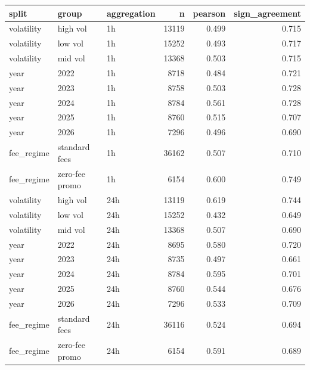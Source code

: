 \begin{tabular}{lllrrr}
\toprule
split & group & aggregation & n & pearson & sign_agreement \\
\midrule
volatility & high vol & 1h & 13119 & 0.499 & 0.715 \\
volatility & low vol & 1h & 15252 & 0.493 & 0.717 \\
volatility & mid vol & 1h & 13368 & 0.503 & 0.715 \\
year & 2022 & 1h & 8718 & 0.484 & 0.721 \\
year & 2023 & 1h & 8758 & 0.503 & 0.728 \\
year & 2024 & 1h & 8784 & 0.561 & 0.728 \\
year & 2025 & 1h & 8760 & 0.515 & 0.707 \\
year & 2026 & 1h & 7296 & 0.496 & 0.690 \\
fee_regime & standard fees & 1h & 36162 & 0.507 & 0.710 \\
fee_regime & zero-fee promo & 1h & 6154 & 0.600 & 0.749 \\
volatility & high vol & 24h & 13119 & 0.619 & 0.744 \\
volatility & low vol & 24h & 15252 & 0.432 & 0.649 \\
volatility & mid vol & 24h & 13368 & 0.507 & 0.690 \\
year & 2022 & 24h & 8695 & 0.580 & 0.720 \\
year & 2023 & 24h & 8735 & 0.497 & 0.661 \\
year & 2024 & 24h & 8784 & 0.595 & 0.701 \\
year & 2025 & 24h & 8760 & 0.544 & 0.676 \\
year & 2026 & 24h & 7296 & 0.533 & 0.709 \\
fee_regime & standard fees & 24h & 36116 & 0.524 & 0.694 \\
fee_regime & zero-fee promo & 24h & 6154 & 0.591 & 0.689 \\
\bottomrule
\end{tabular}

